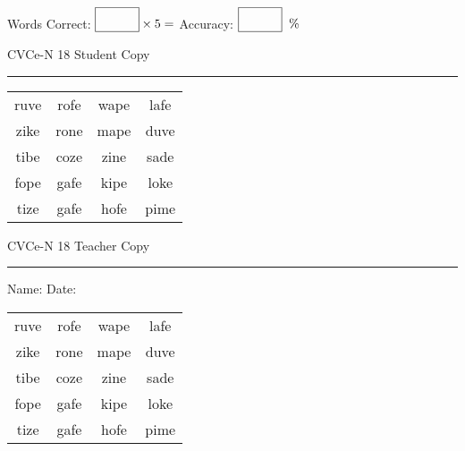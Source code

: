 \documentclass{memoir}
\begin{document}
\small

Words Correct: $\fbox{\phantom{\huge 100}} \times 5 = $ Accuracy: $\fbox{\phantom{\huge 100}}\;\; \%$ 

\vfill

\newpage


\footnotesize \noindent
CVCe-N 18 \hfill Student Copy
\smallskip
\hrule

\Large

\setlength{\tabcolsep}{14pt}
\def\arraystretch{2}

{\selectfont


\begin{vplace}[0.5]
\begin{center}
\begin{tabular}{cccc}
ruve & rofe & wape & lafe \\
zike & rone & mape & duve \\
tibe & coze & zine & sade \\
fope & gafe & kipe & loke \\
tize & gafe & hofe & pime \\
\end{tabular}
\end{center}
\end{vplace}

}

\newpage

\footnotesize \noindent
CVCe-N 18 \hfill Teacher Copy
\smallskip
\hrule

\small

\vfill

\noindent
Name: \underline{\hspace{1.75in}} \hfill Date: \underline{\hspace{1in}}

\Large

{\selectfont


\begin{vplace}[0.5]
\begin{center}
\begin{tabular}{cccc}
ruve & rofe & wape & lafe \\
zike & rone & mape & duve \\
tibe & coze & zine & sade \\
fope & gafe & kipe & loke \\
tize & gafe & hofe & pime \\
\end{tabular}
\end{center}
\end{vplace}



}
\end{document}
